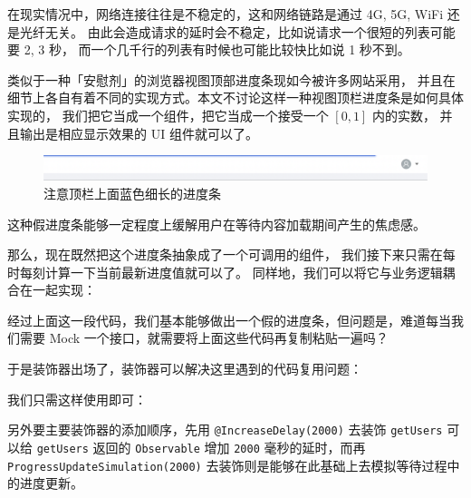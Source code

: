 \documentclass{ctexart}
\begin{document}
    在现实情况中，网络连接往往是不稳定的，这和网络链路是通过 4G, 5G, WiFi 还是光纤无关。
    由此会造成请求的延时会不稳定，比如说请求一个很短的列表可能要 2, 3 秒，
    而一个几千行的列表有时候也可能比较快比如说 1 秒不到。

    类似于一种「安慰剂」的浏览器视图顶部进度条现如今被许多网站采用，
    并且在细节上各自有着不同的实现方式。本文不讨论这样一种视图顶栏进度条是如何具体实现的，
    我们把它当成一个组件，把它当成一个接受一个 $[0,1]$ 内的实数，
    并且输出是相应显示效果的 UI 组件就可以了。

    \begin{figure}[H]
        \begin{center}
            \includegraphics[width=\textwidth]{figures/1.png}
            \caption{注意顶栏上面蓝色细长的进度条}
        \end{center}
    \end{figure}
    这种假进度条能够一定程度上缓解用户在等待内容加载期间产生的焦虑感。

    那么，现在既然把这个进度条抽象成了一个可调用的组件，
    我们接下来只需在每时每刻计算一下当前最新进度值就可以了。
    同样地，我们可以将它与业务逻辑耦合在一起实现：

    \pagebreak
    

    经过上面这一段代码，我们基本能够做出一个假的进度条，但问题是，难道每当我们需要 Mock 一个接口，就需要将上面这些代码再复制粘贴一遍吗？

    于是装饰器出场了，装饰器可以解决这里遇到的代码复用问题：

    

    \pagebreak
    我们只需这样使用即可：

    

    另外要主要装饰器的添加顺序，先用 \verb`@IncreaseDelay(2000)` 去装饰 \verb`getUsers` 可以给 \verb`getUsers` 返回的 \verb`Observable` 增加 \verb`2000` 毫秒的延时，而再 \verb`ProgressUpdateSimulation(2000)` 去装饰则是能够在此基础上去模拟等待过程中的进度更新。
\end{document}
